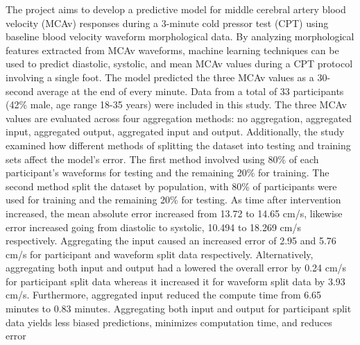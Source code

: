 The project aims to develop a predictive model for middle cerebral artery blood velocity (MCAv) responses during a 3-minute cold pressor test (CPT) using baseline blood velocity waveform morphological data. By analyzing morphological features extracted from MCAv waveforms, machine learning techniques can be used to predict diastolic, systolic, and mean MCAv values during a CPT protocol involving a single foot. The model predicted the three MCAv values as a 30-second average at the end of every minute. Data from a total of 33 participants (42\% male, age range 18-35 years) were included in this study. The three MCAv values are evaluated across four aggregation methods: no aggregation, aggregated input, aggregated output, aggregated input and output. Additionally, the study examined how different methods of splitting the dataset into testing and training sets affect the model’s error. The first method involved using 80\% of each participant’s waveforms for testing and the remaining 20\% for training. The second method split the dataset by population, with 80\% of participants were used for training and the remaining 20\% for testing. As time after intervention increased, the mean absolute error increased from 13.72 to 14.65 cm/s, likewise error increased going from diastolic to systolic, 10.494 to 18.269 cm/s respectively. Aggregating the input caused an increased error of 2.95 and 5.76 cm/s for participant and waveform split data respectively. Alternatively, aggregating both input and output had a lowered the overall error by 0.24 cm/s for participant split data whereas it increased it for waveform split data by 3.93 cm/s. Furthermore, aggregated input reduced the compute time from 6.65 minutes to 0.83 minutes. Aggregating both input and output for participant split data yields less biased predictions, minimizes computation time, and reduces error